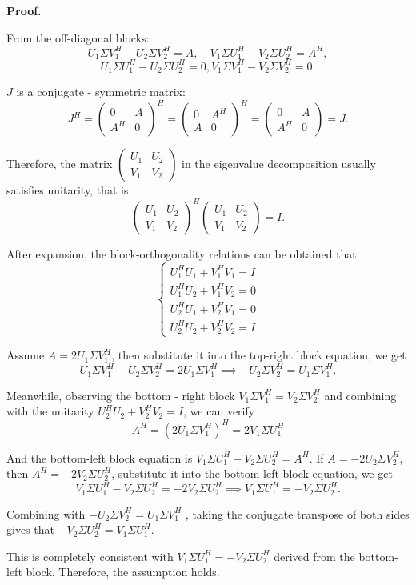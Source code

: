 \documentclass[a4paper, 11pt]{article}
\newenvironment{solution}
    {\textbf{Proof.}}
    {}
\begin{document}
\begin{solution}
\begin{enumerate}
	From the off-diagonal blocks:
$$
	U_1 \Sigma V_1^H - U_2 \Sigma V_2^H = A, \quad V_1 \Sigma U_1^H - V_2 \Sigma U_2^H = A^H,
$$
$$
    U_1 \Sigma U_1^H - U_2\Sigma U_2^H = 0,  V_1\Sigma V_1^H - V_2\Sigma V_2^H = 0.
$$

\(J\) is a conjugate - symmetric matrix:
$$
J^H=\begin{pmatrix}0&A\\A^H&0\end{pmatrix}^H=\begin{pmatrix}0&A^H\\A&0\end{pmatrix}^H=\begin{pmatrix}0&A\\A^H&0\end{pmatrix}=J.
$$

Therefore, the matrix \(\begin{pmatrix}U_1&U_2\\V_1&V_2\end{pmatrix}\) in the eigenvalue decomposition usually satisfies unitarity, that is:
$$
\begin{pmatrix}U_1&U_2\\V_1&V_2\end{pmatrix}^H\begin{pmatrix}U_1&U_2\\V_1&V_2\end{pmatrix}=I.
$$

After expansion, the block-orthogonality relations can be obtained that
$$
\begin{cases}U_1^HU_1 + V_1^HV_1 = I\\U_1^HU_2 + V_1^HV_2 = 0\\U_2^HU_1 + V_2^HV_1 = 0\\U_2^HU_2 + V_2^HV_2 = I\end{cases}
$$

Assume \(A = 2U_1\Sigma V_1^H\), then substitute it into the top-right block equation, we get
$$
U_1\Sigma V_1^H - U_2\Sigma V_2^H = 2U_1\Sigma V_1^H\implies - U_2\Sigma V_2^H = U_1\Sigma V_1^H.
$$

Meanwhile, observing the bottom - right block \(V_1\Sigma V_1^H = V_2\Sigma V_2^H\) and combining with the unitarity \(U_2^HU_2 + V_2^HV_2 = I\), we can verify
$$
A^H=(2U_1\Sigma V_1^H)^H = 2V_1\Sigma U_1^H
$$

And the bottom-left block equation is \(V_1\Sigma U_1^H - V_2\Sigma U_2^H = A^H\). If \(A = - 2U_2\Sigma V_2^H\), then \(A^H=-2V_2\Sigma U_2^H\), substitute it into the bottom-left block equation, we get
$$
V_1\Sigma U_1^H - V_2\Sigma U_2^H=-2V_2\Sigma U_2^H\implies V_1\Sigma U_1^H=-V_2\Sigma U_2^H.
$$

Combining with \(-U_2\Sigma V_2^H = U_1\Sigma V_1^H\) , taking the conjugate transpose of both sides gives that \(-V_2\Sigma U_2^H = V_1\Sigma U_1^H\).

This is completely consistent with \(V_1\Sigma U_1^H=-V_2\Sigma U_2^H\) derived from the bottom-left block. Therefore, the assumption holds.

	\end{enumerate}
\end{solution}
\end{document}
